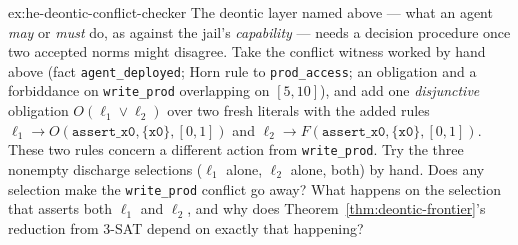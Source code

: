 \documentclass[11pt,a4paper]{article}
\theoremstyle{definition}
\theoremstyle{definition}
\theoremstyle{remark}
\begin{document}
\begin{pdexercise}[kind=Trace,rating=2]{ex:he-deontic-conflict-checker}
The deontic layer named above --- what an agent \emph{may} or \emph{must} do,
as against the jail's \emph{capability} --- needs a decision procedure once two
accepted norms might disagree. Take the conflict witness worked by hand above
(fact \texttt{agent\_deployed}; Horn rule to \texttt{prod\_access}; an obligation
and a forbiddance on \texttt{write\_prod} overlapping on $[5,10]$), and add one
\emph{disjunctive} obligation $O(\ell_1\vee\ell_2)$ over two fresh literals
with the added rules $\ell_1\to O(\texttt{assert\_x0},\{\texttt{x0}\},[0,1])$
and $\ell_2\to F(\texttt{assert\_x0},\{\texttt{x0}\},[0,1])$.
These two rules concern a different action from \texttt{write\_prod}.
Try the three nonempty discharge selections ($\ell_1$ alone, $\ell_2$ alone,
both) by hand. Does any selection make the \texttt{write\_prod} conflict go
away? What happens on the selection that asserts both $\ell_1$ and $\ell_2$, and
why does Theorem~\ref{thm:deontic-frontier}'s reduction from 3-SAT depend on exactly that happening?
\end{pdexercise}
\end{document}
